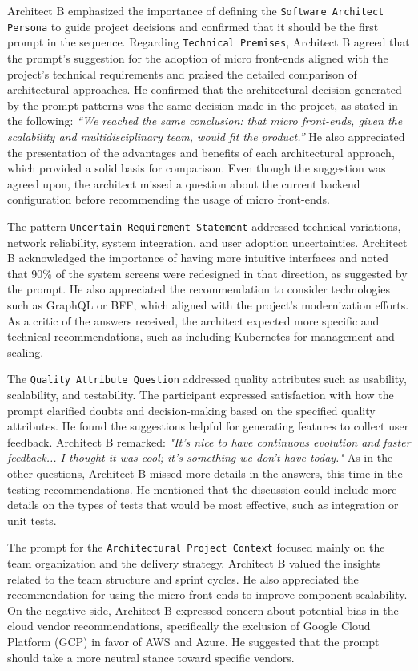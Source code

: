 \documentclass[runningheads]{llncs}
\begin{document}
Architect B emphasized the importance of defining the \texttt{Software Architect Persona} to guide project decisions and confirmed that it should be the first prompt in the sequence. Regarding \texttt{Technical Premises}, Architect B agreed that the prompt’s suggestion for the adoption of micro front-ends\cite{microservices2022} aligned with the project’s technical requirements and praised the detailed comparison of architectural approaches. He confirmed that the architectural decision generated by the prompt patterns was the same decision made in the project, as stated in the following: \textit{“We reached the same conclusion: that micro front-ends, given the scalability and multidisciplinary team, would fit the product.”} He also appreciated the presentation of the advantages and benefits of each architectural approach, which provided a solid basis for comparison. Even though the suggestion was agreed upon, the architect missed a question about the current backend configuration before recommending the usage of micro front-ends. 

The pattern \texttt{Uncertain Requirement Statement} addressed technical variations, network reliability, system integration, and user adoption uncertainties. Architect B acknowledged the importance of having more intuitive interfaces and noted that 90\% of the system screens were redesigned in that direction, as suggested by the prompt. He also appreciated the recommendation to consider technologies such as GraphQL or BFF, which aligned with the project’s modernization efforts. As a critic of the answers received, the architect expected more specific and technical recommendations, such as including Kubernetes for management and scaling.

The \texttt{Quality Attribute Question} addressed quality attributes such as usability, scalability, and testability. The participant expressed satisfaction with how the prompt clarified doubts and decision-making based on the specified quality attributes. He found the suggestions helpful for generating features to collect user feedback. Architect B remarked: \textit{"It’s nice to have continuous evolution and faster feedback... I thought it was cool; it’s something we don’t have today."} As in the other questions, Architect B missed more details in the answers, this time in the testing recommendations. He mentioned that the discussion could include more details on the types of tests that would be most effective, such as integration or unit tests. 

The prompt for the \texttt{Architectural Project Context} focused mainly on the team organization and the delivery strategy. Architect B valued the insights related to the team structure and sprint cycles. He also appreciated the recommendation for using the micro front-ends to improve component scalability. On the negative side, Architect B expressed concern about potential bias in the cloud vendor recommendations, specifically the exclusion of Google Cloud Platform (GCP) in favor of AWS and Azure. He suggested that the prompt should take a more neutral stance toward specific vendors.
\end{document}
